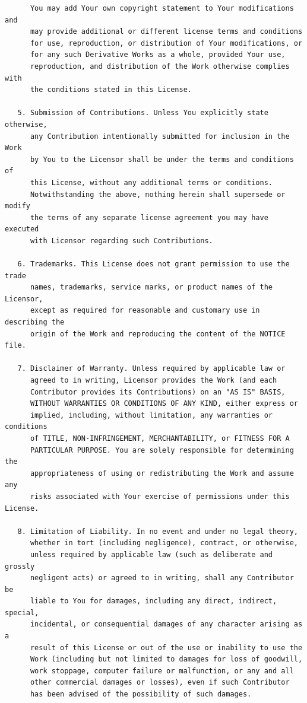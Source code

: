 \documentclass{book}
\begin{document}
\begin{verbatim}
      You may add Your own copyright statement to Your modifications and
      may provide additional or different license terms and conditions
      for use, reproduction, or distribution of Your modifications, or
      for any such Derivative Works as a whole, provided Your use,
      reproduction, and distribution of the Work otherwise complies with
      the conditions stated in this License.

   5. Submission of Contributions. Unless You explicitly state otherwise,
      any Contribution intentionally submitted for inclusion in the Work
      by You to the Licensor shall be under the terms and conditions of
      this License, without any additional terms or conditions.
      Notwithstanding the above, nothing herein shall supersede or modify
      the terms of any separate license agreement you may have executed
      with Licensor regarding such Contributions.

   6. Trademarks. This License does not grant permission to use the trade
      names, trademarks, service marks, or product names of the Licensor,
      except as required for reasonable and customary use in describing the
      origin of the Work and reproducing the content of the NOTICE file.

   7. Disclaimer of Warranty. Unless required by applicable law or
      agreed to in writing, Licensor provides the Work (and each
      Contributor provides its Contributions) on an "AS IS" BASIS,
      WITHOUT WARRANTIES OR CONDITIONS OF ANY KIND, either express or
      implied, including, without limitation, any warranties or conditions
      of TITLE, NON-INFRINGEMENT, MERCHANTABILITY, or FITNESS FOR A
      PARTICULAR PURPOSE. You are solely responsible for determining the
      appropriateness of using or redistributing the Work and assume any
      risks associated with Your exercise of permissions under this License.

   8. Limitation of Liability. In no event and under no legal theory,
      whether in tort (including negligence), contract, or otherwise,
      unless required by applicable law (such as deliberate and grossly
      negligent acts) or agreed to in writing, shall any Contributor be
      liable to You for damages, including any direct, indirect, special,
      incidental, or consequential damages of any character arising as a
      result of this License or out of the use or inability to use the
      Work (including but not limited to damages for loss of goodwill,
      work stoppage, computer failure or malfunction, or any and all
      other commercial damages or losses), even if such Contributor
      has been advised of the possibility of such damages.


\end{verbatim}
\end{document}
